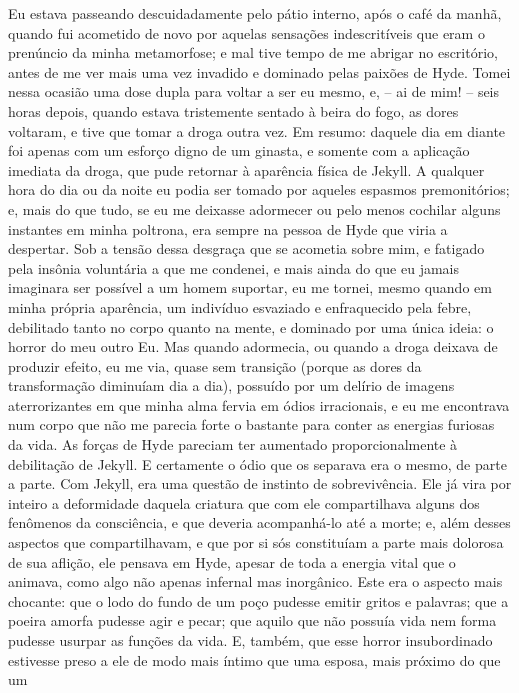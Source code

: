 Eu estava passeando descuidadamente pelo pátio interno, após o café da
manhã, quando fui acometido de novo por aquelas sensações
indescritíveis que eram o prenúncio da minha metamorfose; e mal tive
tempo de me abrigar no escritório, antes de me ver mais uma vez
invadido e dominado pelas paixões de Hyde.  Tomei nessa ocasião uma
dose dupla para voltar a ser eu mesmo, e, -- ai de mim! -- seis horas
depois, quando estava tristemente sentado à beira do fogo, as dores
voltaram, e tive que tomar a droga outra vez.  Em resumo: daquele dia
em diante foi apenas com um esforço digno de um ginasta, e somente com
a aplicação imediata da droga, que pude retornar à aparência física de
Jekyll.  A qualquer hora do dia ou da noite eu podia ser tomado por
aqueles espasmos premonitórios; e, mais do que tudo, se eu me deixasse
adormecer ou pelo menos cochilar alguns instantes em minha poltrona,
era sempre na pessoa de Hyde que viria a despertar.  Sob a tensão dessa
desgraça que se acometia sobre mim, e fatigado pela insônia voluntária
a que me condenei, e mais ainda do que eu jamais imaginara ser possível
a um homem suportar, eu me tornei, mesmo quando em minha própria
aparência, um indivíduo esvaziado e enfraquecido pela febre, debilitado
tanto no corpo quanto na mente, e dominado por uma única ideia: o
horror do meu outro Eu.  Mas quando adormecia, ou quando a droga
deixava de produzir efeito, eu me via, quase sem transição (porque as
dores da transformação diminuíam dia a dia), possuído por um delírio de
imagens aterrorizantes em que minha alma fervia em ódios irracionais, e
eu me encontrava num corpo que não me parecia forte o bastante para
conter as energias furiosas da vida.  As forças de Hyde pareciam ter
aumentado proporcionalmente à debilitação de Jekyll.  E certamente o
ódio que os separava era o mesmo, de parte a parte.  Com Jekyll, era
uma questão de instinto de sobrevivência.  Ele já vira por inteiro a
deformidade daquela criatura que com ele compartilhava alguns dos
fenômenos da consciência, e que deveria acompanhá-lo até a morte; e,
além desses aspectos que compartilhavam, e que por si sós constituíam a
parte mais dolorosa de sua aflição, ele pensava em Hyde, apesar de toda
a energia vital que o animava, como algo não apenas infernal mas
inorgânico.  Este era o aspecto mais chocante: que o lodo do fundo de
um poço pudesse emitir gritos e palavras; que a poeira amorfa pudesse
agir e pecar; que aquilo que não possuía vida nem forma pudesse usurpar
as funções da vida.  E, também, que esse horror insubordinado estivesse
preso a ele de modo mais íntimo que uma esposa, mais próximo do que um
